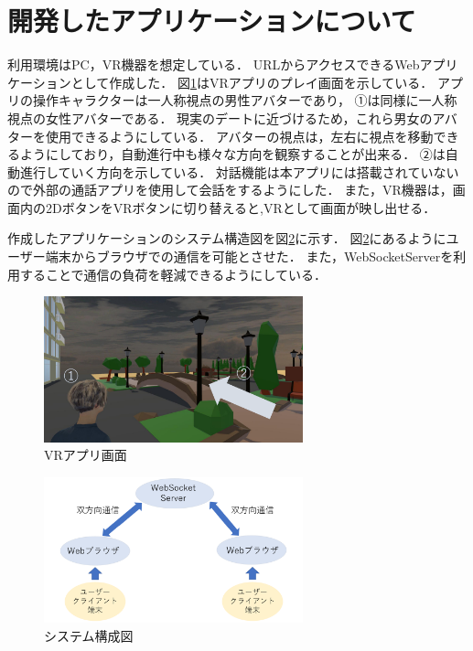 \documentclass[twocolumn,10pt,a4j]{ltjsarticle}
\begin{document}
\section{開発したアプリケーションについて}
利用環境はPC，VR機器を想定している．
URLからアクセスできるWebアプリケーションとして作成した．
図\ref{fig:screen}はVRアプリのプレイ画面を示している．
アプリの操作キャラクターは一人称視点の男性アバターであり，
①は同様に一人称視点の女性アバターである．
現実のデートに近づけるため，これら男女のアバターを使用できるようにしている．
アバターの視点は，左右に視点を移動できるようにしており，自動進行中も様々な方向を観察することが出来る．
②は自動進行していく方向を示している．
対話機能は本アプリには搭載されていないので外部の通話アプリを使用して会話をするようにした．
また，VR機器は，画面内の2DボタンをVRボタンに切り替えると,VRとして画面が映し出せる．

作成したアプリケーションのシステム構造図を図\ref{fig:system}に示す．
図\ref{fig:system}にあるようにユーザー端末からブラウザでの通信を可能とさせた．
また，WebSocketServerを利用することで通信の負荷を軽減できるようにしている．


\begin{figure}[h]
\begin{center}
\includegraphics[width=75mm]{apurinai.pdf}
\end{center}
 \caption{VRアプリ画面}
 \label{fig:screen}
\end{figure}

\begin{figure}[h]
\begin{center}
\includegraphics[width=75mm]{systemkouzou.pdf}
\end{center}
 \caption{システム構成図}
 \label{fig:system}
\end{figure}
\end{document}
